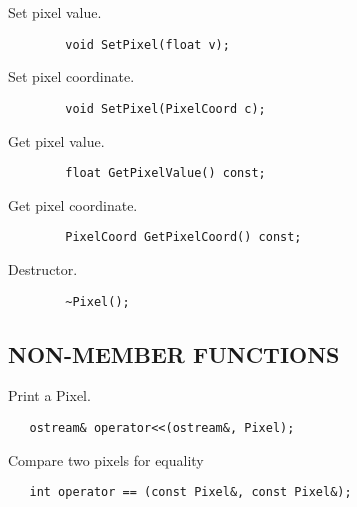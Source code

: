          Set pixel value.
\begin{verbatim}
        void SetPixel(float v);
\end{verbatim}

         Set pixel coordinate.
\begin{verbatim}
        void SetPixel(PixelCoord c);
\end{verbatim}

         Get pixel value.
\begin{verbatim}
        float GetPixelValue() const;
\end{verbatim}

         Get pixel coordinate.
\begin{verbatim}
        PixelCoord GetPixelCoord() const;
\end{verbatim}

         Destructor.
\begin{verbatim}
        ~Pixel();
\end{verbatim}

\subsection*{NON-MEMBER FUNCTIONS}

 Print a Pixel.
\begin{verbatim}
   ostream& operator<<(ostream&, Pixel);
\end{verbatim}

 Compare two pixels for equality
\begin{verbatim}
   int operator == (const Pixel&, const Pixel&);
\end{verbatim}

